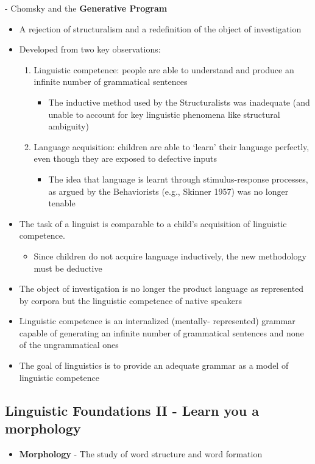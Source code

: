 \documentclass[11pt]{article}
\begin{document}
- Chomsky and the \textbf{Generative Program}
\begin{itemize}
\item A rejection of structuralism and a redefinition of the object of investigation
\item Developed from two key observations:
  \begin{enumerate}
  \item Linguistic competence: people are able to understand and produce an infinite number of grammatical sentences
    \begin{itemize}
    \item The inductive method used by the Structuralists was inadequate (and unable to account for key linguistic phenomena like structural ambiguity)
    \end{itemize}
  \item Language acquisition: children are able to ‘learn’ their language perfectly, even though they are exposed to defective inputs
    \begin{itemize}
    \item The idea that language is learnt through stimulus-response processes, as argued by the Behaviorists (e.g., Skinner 1957) was no longer tenable
    \end{itemize}
  \end{enumerate}
\item The task of a linguist is comparable to a child’s acquisition of linguistic competence.
  \begin{itemize}
  \item Since children do not acquire language inductively, the new methodology must be deductive
  \end{itemize}
\item The object of investigation is no longer the product language as represented by corpora but the linguistic competence of native speakers
\item Linguistic competence is an internalized (mentally- represented) grammar capable of generating an infinite number of grammatical sentences and none of the ungrammatical ones
\item The goal of linguistics is to provide an adequate grammar as a model of linguistic competence
\end{itemize}

\subsection{Linguistic Foundations II - Learn you a morphology}
\begin{itemize}
 \item \textbf{Morphology} - The study of word structure and word formation
\end{itemize}
\end{document}
